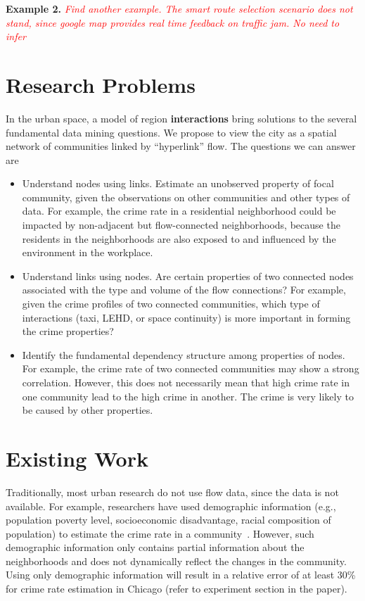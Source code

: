 \textbf{Example 2.} \emph{\textcolor{red}{Find another example. The smart route selection scenario does not stand, since google map provides real time feedback on traffic jam. No need to infer}}





\section{Research Problems}


In the urban space, a model of region \textbf{interactions} bring solutions to the several fundamental data mining questions. We propose to view the city as a spatial network of communities linked by ``hyperlink'' flow. The questions we can answer are
\begin{itemize}
\item Understand nodes using links. Estimate an unobserved property of focal community, given the observations on other communities and other types of data. For example, the crime rate in a residential neighborhood could be impacted by  non-adjacent but flow-connected neighborhoods, because the residents in the neighborhoods are also exposed to and influenced by the environment in the workplace.
\item Understand links using nodes. Are certain properties of two connected nodes associated with the type and volume of the flow connections? For example, given the crime profiles of two connected communities, which type of interactions (taxi, LEHD, or space continuity) is more important in forming the crime properties?
\item Identify the fundamental dependency structure among properties of nodes. For example, the crime rate of two connected communities may show a strong correlation. However, this does not necessarily mean that high crime rate in one community lead to the high crime in another. The crime is very likely to be caused by other properties. 
\end{itemize}




\section{Existing Work}



Traditionally, most urban research  do not use flow data, since the data is not available. For example, researchers have used demographic information (e.g., population poverty level, socioeconomic disadvantage, racial composition of population) to estimate the crime rate in a community~\cite{GrSa09}. However,  such demographic information only contains partial information about the neighborhoods and does not dynamically reflect the changes in the community. Using only demographic information will result in a relative error of at least 30\% for crime rate estimation in Chicago (refer to experiment section in the paper).



